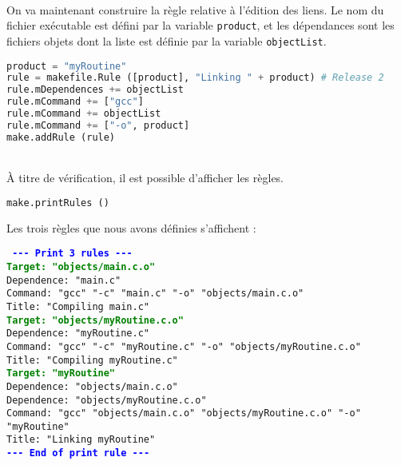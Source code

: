 \documentclass[a4paper,11pt]{extarticle}
\begin{document}
~\\On va maintenant construire la règle relative à l'édition des liens. Le nom du fichier exécutable est défini par la variable \texttt{product}, et les dépendances sont les fichiers objets dont la liste est définie par la variable \texttt{objectList}.
\begin{lstlisting}[language=py]
product = "myRoutine"
rule = makefile.Rule ([product], "Linking " + product) # Release 2
rule.mDependences += objectList
rule.mCommand += ["gcc"]
rule.mCommand += objectList
rule.mCommand += ["-o", product]
make.addRule (rule)
\end{lstlisting}

~\\À titre de vérification, il est possible d'afficher les règles.
\begin{lstlisting}[language=py]
make.printRules ()
\end{lstlisting}

Les trois règles que nous avons définies s'affichent :

\begin{mdframed}[hidealllines=true,backgroundcolor=lightgray!20]
\tt\footnotesize
\textcolor{blue}{\bf{-}{-}{-} Print 3 rules {-}{-}{-}}\\
\textcolor{green}{\bf Target: "objects/main.c.o"}\\
\hspace*{1.2em}Dependence: "main.c"\\
\hspace*{1.2em}Command:  "gcc" "-c" "main.c" "-o" "objects/main.c.o"\\
\hspace*{1.2em}Title: "Compiling main.c"\\
\textcolor{green}{\bf Target: "objects/myRoutine.c.o"}\\
\hspace*{1.2em}Dependence: "myRoutine.c"\\
\hspace*{1.2em}Command:  "gcc" "-c" "myRoutine.c" "-o" "objects/myRoutine.c.o"\\
\hspace*{1.2em}Title: "Compiling myRoutine.c"\\
\textcolor{green}{\bf Target: "myRoutine"}\\
\hspace*{1.2em}Dependence: "objects/main.c.o"\\
\hspace*{1.2em}Dependence: "objects/myRoutine.c.o"\\
\hspace*{1.2em}Command:  "gcc" "objects/main.c.o" "objects/myRoutine.c.o" "-o" "myRoutine"\\
\hspace*{1.2em}Title: "Linking myRoutine"\\
\textcolor{blue}{\bf{-}{-}{-} End of print rule {-}{-}{-}}
\end{mdframed}
\end{document}

